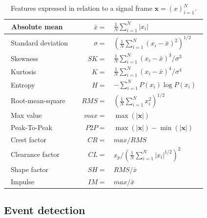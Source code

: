 \documentclass[letterpaper]{article} %
\begin{document}

\begin{table}[!htbp]
\centering
\setlength\tabcolsep{1pt}
\def\arraystretch{1.5}
\begin{tabular}{|l|rl|}
\hline ~Absolute mean~ & $\bar{x}=$ & $\frac{1}{N} \sum_{i=1}^N\left|x_i\right|$ \\
\hline ~Standard deviation~ & $\sigma=$ & $ (\frac{1}{N} \sum_{i=1}^N (x_i-\bar{x})^2)^{1/2}$ \\
\hline ~Skewness~ & $SK=$ & $\frac{1}{N} \sum_{i=1}^N (x_i-\bar{x})^3 / \sigma^3$ \\ 
\hline ~Kurtosis~ & $K=$ & $\frac{1}{N} \sum_{i=1}^N (x_i-\bar{x})^4 / \sigma^4$ \\ 
\hline ~Entropy~ & $H =$ & $-\sum_{i=1}^N P(x_i) \log P(x_i)$~ \\
\hline ~Root-mean-square~ & ~$RMS=$ & $ (\frac{1}{N} \sum_{i=1}^N x_i^2)^{1/2}$ \\
\hline ~Max value~ & $max=$ & $\max(|\bm{x}|)$\\
\hline ~Peak-To-Peak~ &$P2P=$& $\max(|\bm{x}|) - \min(|\bm{x}|)$\\
\hline ~Crest factor~ &$CR=$& $max / RMS$\\
\hline ~Clearance factor~ &$CL=$ & $ x_p / (\frac{1}{N} \sum_{i=1}^N |x_i|^{1/2})^2$\\
\hline ~Shape factor~ & $SH=$ & $RMS / \bar{x}$\\
\hline ~Impulse~ & $IM=$ & $max / \bar{x}$\\
\hline
\end{tabular}
\caption{Features expressed in relation to a signal frame $\bm{x} = (x)_{i=1}^N$.}
\label{tab:dist_tab}
\end{table}

\subsection{Event detection}
\end{document}
